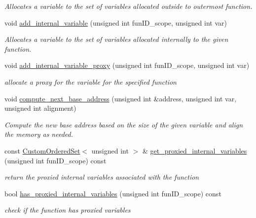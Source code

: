 \begin{DoxyCompactItemize}
\begin{DoxyCompactList}\small\item\em Allocates a variable to the set of variables allocated outside to outermost function. \end{DoxyCompactList}\item 
void \hyperlink{classmemory_a492d9004bff7ff81122a6bb4c2cc6b2d}{add\+\_\+internal\+\_\+variable} (unsigned int fun\+I\+D\+\_\+scope, unsigned int var)
\begin{DoxyCompactList}\small\item\em Allocates a variable to the set of variables allocated internally to the given function. \end{DoxyCompactList}\item 
void \hyperlink{classmemory_af1e653b61323d7728656dadf8249a369}{add\+\_\+internal\+\_\+variable\+\_\+proxy} (unsigned int fun\+I\+D\+\_\+scope, unsigned int var)
\begin{DoxyCompactList}\small\item\em allocate a proxy for the variable for the specified function \end{DoxyCompactList}\item 
void \hyperlink{classmemory_aaa68bc383457b382d8fdac9d29d74def}{compute\+\_\+next\+\_\+base\+\_\+address} (unsigned int \&address, unsigned int var, unsigned int alignment)
\begin{DoxyCompactList}\small\item\em Compute the new base address based on the size of the given variable and align the memory as needed. \end{DoxyCompactList}\item 
const \hyperlink{classCustomOrderedSet}{Custom\+Ordered\+Set}$<$ unsigned int $>$ \& \hyperlink{classmemory_afa287c1bff2634613e59d7ece4d74d60}{get\+\_\+proxied\+\_\+internal\+\_\+variables} (unsigned int fun\+I\+D\+\_\+scope) const
\begin{DoxyCompactList}\small\item\em return the proxied internal variables associated with the function \end{DoxyCompactList}\item 
bool \hyperlink{classmemory_a792d6586b289c275ef9728053681bc08}{has\+\_\+proxied\+\_\+internal\+\_\+variables} (unsigned int fun\+I\+D\+\_\+scope) const
\begin{DoxyCompactList}\small\item\em check if the function has proxied variables \end{DoxyCompactList}\item 

\end{DoxyCompactItemize}
